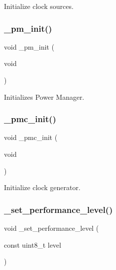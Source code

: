 Initialize clock sources. 

\mbox{\label{group___h_p_l_ga0e9b9fbf16506f0f6ad8e8b1aa87dc73}} 
\subsubsection{\texorpdfstring{\+\_\+pm\+\_\+init()}{\_pm\_init()}}
{\footnotesize\ttfamily void \+\_\+pm\+\_\+init (\begin{DoxyParamCaption}\item[{void}]{ }\end{DoxyParamCaption})}



Initializes Power Manager. 

\mbox{\label{group___h_p_l_ga580e99e942064901ed0f02f5d8789c7a}} 
\subsubsection{\texorpdfstring{\+\_\+pmc\+\_\+init()}{\_pmc\_init()}}
{\footnotesize\ttfamily void \+\_\+pmc\+\_\+init (\begin{DoxyParamCaption}\item[{void}]{ }\end{DoxyParamCaption})}



Initialize clock generator. 

\mbox{\label{group___h_p_l_ga1668b7fc690ec56e1f3d54d9f3b8e5f2}} 
\subsubsection{\texorpdfstring{\+\_\+set\+\_\+performance\+\_\+level()}{\_set\_performance\_level()}}
{\footnotesize\ttfamily void \+\_\+set\+\_\+performance\+\_\+level (\begin{DoxyParamCaption}\item[{const uint8\+\_\+t}]{level }\end{DoxyParamCaption})}



